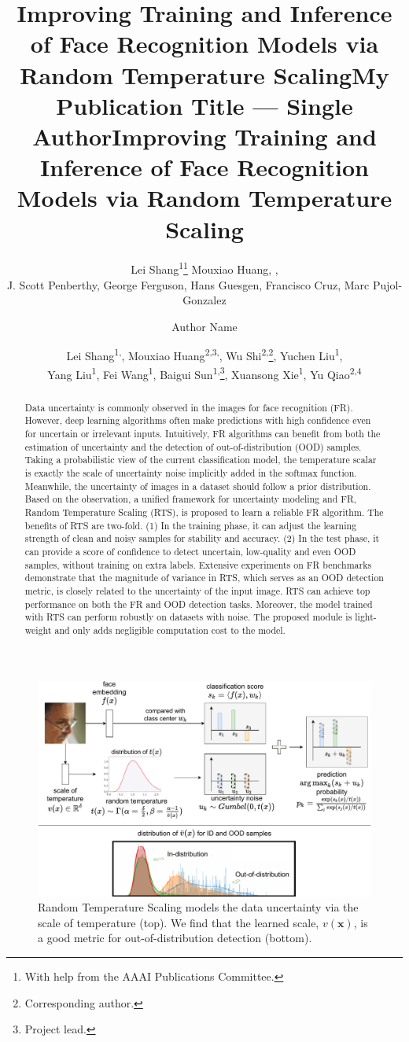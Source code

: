 \documentclass[letterpaper]{article} %
\title{Improving Training and Inference of Face Recognition Models via Random Temperature Scaling}
\author{
Lei Shang\textsuperscript{\rm 1}\thanks{With help from the AAAI Publications Committee.}
Mouxiao Huang,
,\\
J. Scott Penberthy,
George Ferguson,
Hans Guesgen,
Francisco Cruz\equalcontrib,
Marc Pujol-Gonzalez\equalcontrib
}
\title{My Publication Title --- Single Author}
\author {
Author Name
}
\title{Improving Training and Inference of Face Recognition Models via Random Temperature Scaling}
\author {
Lei Shang\textsuperscript{\rm 1,}\equalcontrib,
Mouxiao Huang\textsuperscript{\rm 2,3,}\equalcontrib,
Wu Shi\textsuperscript{\rm 2,}\thanks{Corresponding author.},
Yuchen Liu\textsuperscript{\rm 1},\\
Yang Liu\textsuperscript{\rm 1},
Fei Wang\textsuperscript{\rm 1},
Baigui Sun\textsuperscript{\rm 1,}\thanks{Project lead.},
Xuansong Xie\textsuperscript{\rm 1},
Yu Qiao\textsuperscript{\rm 2,4}
}
\begin{document}
\maketitle

\begin{abstract}
Data uncertainty is commonly observed in the images for face recognition (FR). However, deep learning algorithms often make predictions with high confidence even for uncertain or irrelevant inputs. Intuitively, FR algorithms can benefit from both the estimation of uncertainty and the detection of out-of-distribution (OOD) samples. Taking a probabilistic view of the current classification model, the temperature scalar is exactly the scale of uncertainty noise implicitly added in the softmax function. Meanwhile, the uncertainty of images in a dataset should follow a prior distribution. Based on the observation, a unified framework for uncertainty modeling and FR, Random Temperature Scaling (RTS), is proposed to learn a reliable FR algorithm. The benefits of RTS are two-fold. (1) In the training phase, it can adjust the learning strength of clean and noisy samples for stability and accuracy. (2) In the test phase, it can provide a score of confidence to detect uncertain, low-quality and even OOD samples, without training on extra labels. Extensive experiments on FR benchmarks demonstrate that the magnitude of variance in RTS, which serves as an OOD detection metric, is closely related to the uncertainty of the input image. RTS can achieve top performance on both the FR and OOD detection tasks. Moreover, the model trained with RTS can perform robustly on datasets with noise. The proposed module is light-weight and only adds negligible computation cost to the model.
\end{abstract}

\begin{figure}[t]
\centering
\includegraphics[width=0.95\linewidth]{figures/fig-teaser-large-fix.pdf}
\caption{Random Temperature Scaling models the data uncertainty via the scale of temperature (top). We find that the learned scale, $v(\bm{x})$, is a good metric for out-of-distribution detection (bottom).}
\label{fig:intro}
\end{figure}
\end{document}

